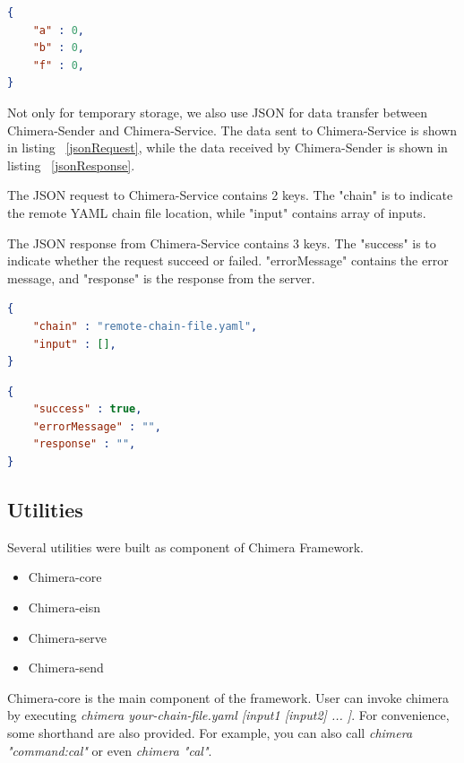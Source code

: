 \documentclass[conference]{IEEEtran}
\begin{document}
\begin{lstlisting}[caption=Initial content of JSON Storage, label=jsonStorageInitial, language=json, basicstyle=\small, breaklines=true]
{
    "a" : 0,
    "b" : 0,
    "f" : 0,
}
\end{lstlisting}

Not only for temporary storage, we also use JSON for data transfer between 
Chimera-Sender and Chimera-Service. The data sent to Chimera-Service is shown in listing
~\ref{jsonRequest}, while the data received by Chimera-Sender is shown in listing
~\ref{jsonResponse}.

The JSON request to Chimera-Service contains 2 keys. The "chain" is to 
indicate the remote YAML chain file location, while "input" contains array of inputs.

The JSON response from Chimera-Service contains 3 keys. The "success" is to indicate
whether the request succeed or failed. "errorMessage" contains the error message, and
"response" is the response from the server.

\begin{lstlisting}[caption=JSON Request, label=jsonRequest, language=json, basicstyle=\small, breaklines=true] 
{
    "chain" : "remote-chain-file.yaml",
    "input" : [],
}
\end{lstlisting}

\begin{lstlisting}[caption=JSON Response, label=jsonResponse, language=json, basicstyle=\small, breaklines=true]
{
    "success" : true,
    "errorMessage" : "",
    "response" : "",
}
\end{lstlisting}


\subsection{Utilities}

Several utilities were built as component of Chimera Framework.

\begin{itemize}
    \item Chimera-core
    \item Chimera-eisn
    \item Chimera-serve
    \item Chimera-send
\end{itemize}

Chimera-core is the main component of the framework. User can invoke chimera by
executing {\it chimera your-chain-file.yaml [input1 [input2] ... ]}. For convenience,
some shorthand are also provided. For example, you can also call 
{\it chimera "command:cal"} or even {\it chimera "cal"}.
\end{document}
